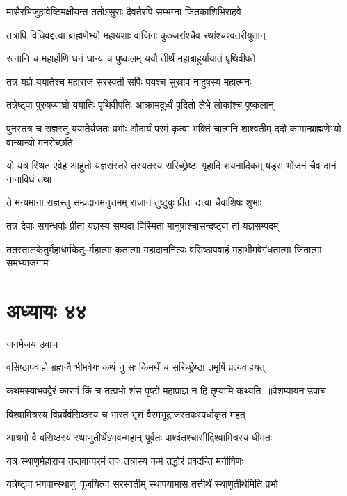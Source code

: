 \twolineshloka
{मांसैरभिजुहावेष्टिमक्षीयन्त ततोऽसुराः}
{दैवतैरपि सम्भग्ना जितकाशिभिराहवे}


\twolineshloka
{तत्रापि विधिवद्दत्त्वा ब्राह्मणेभ्यो महायशाः}
{वाजिनः कुञ्जरांश्चैव रथांश्चश्वतरीयुतान्}


\twolineshloka
{रत्नानि च महार्हाणि धनं धान्यं च पुष्कलम्}
{ययौ तीर्थं महाबाहुर्यायातं पृथिवीपते}


\twolineshloka
{तत्र यज्ञे ययातेश्च महाराज सरस्वती}
{सर्पिः पयश्च सुस्राव नाहुषस्य महात्मनः}


\twolineshloka
{तत्रेष्ट्वा पुरुषव्याघ्रो ययातिः पृथिवीपतिः}
{आक्रामदूर्ध्वं पुदितो लेभे लोकांश्च पुष्कलान्}


\threelineshloka
{पुनस्तत्र च राज्ञस्तु ययातेर्यजतः प्रभोः}
{औदार्यं परमं कृत्वा भक्तिं चात्मनि शाश्वतीम्}
{ददौ कामान्ब्राह्मणेभ्यो वान्यान्यो मनसेच्छति}


\threelineshloka
{यो यत्र स्थित एवेह आहूतो यज्ञसंस्तरे}
{तस्यतस्य सरिच्छ्रेष्ठा गृहादि शयनादिकम्}
{षड्रसं भोजनं चैव दानं नानाविधं तथा}


\twolineshloka
{ते मन्यमाना राज्ञस्तु सम्प्रदानमनुत्तमम्}
{राजानं तुष्टुवुः प्रीता दत्त्वा चैवाशिषः शुभाः}


\twolineshloka
{तत्र देवाः सगन्धर्वाः प्रीता यज्ञस्य सम्पदा}
{विस्मिता मानुषाश्चासन्दृष्ट्वा तां यज्ञसम्पदम्}


\twolineshloka
{ततस्तालकेतुर्महाधर्मकेतु--र्महात्मा कृतात्मा महादाननित्यः}
{वसिष्ठापवाहं महाभीमवेगंधृतात्मा जितात्मा समभ्याजगाम}


\chapter{अध्यायः ४४}
\twolineshloka
{जनमेजय उवाच}
{}


\twolineshloka
{वसिष्ठापवाहो ब्रह्मन्वै भीमवेगः कथं नु सः}
{किमर्थं च सरिच्छ्रेष्ठा तमृषिं प्रत्यवाहयत्}


\threelineshloka
{कथमस्याभवद्वैरं कारणं किं च तत्प्रभो}
{शंस पृष्टो महाप्राज्ञ न हि तृप्यामि कथ्यति ॥वैशम्पायन उवाच}
{}


\twolineshloka
{विश्वामित्रस्य विप्रर्षेर्वसिष्ठस्य च भारत}
{भृशं वैरमभूद्राजंस्तपःस्पर्धाकृतं महत्}


\twolineshloka
{आश्रमो वै वसिष्ठस्य स्थाणुतीर्थेऽभवन्महान्}
{पूर्वतः पार्श्वतश्चासीद्विश्वामित्रस्य धीमतः}


\twolineshloka
{यत्र स्थाणुर्महाराज तप्तवान्परमं तपः}
{तत्रास्य कर्म तद्धोरं प्रवदन्ति मनीषिणः}


\twolineshloka
{यत्रेष्ट्वा भगवान्स्थाणुः पूजयित्वा सरस्वतीम्}
{स्थापयामास तत्तीर्थं स्थाणुतीर्थमिति प्रभो}


